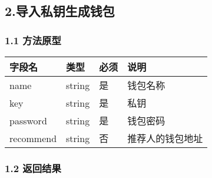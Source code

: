 \documentclass[letterpaper,10pt,english]{sphinxmanual}
\begin{document}

\begin{sphinxVerbatim}[commandchars=\\\{\}]
     
\end{sphinxVerbatim}


\subsection{2.导入私钥生成钱包}
\label{\detokenize{BCBWalletSDK_u63a5_u53e3_u8bf4_u660e:id21}}

\subsubsection{1.1 方法原型}
\label{\detokenize{BCBWalletSDK_u63a5_u53e3_u8bf4_u660e:id22}}



\begin{savenotes}\sphinxattablestart
\centering
\begin{tabulary}{\linewidth}[t]{|T|T|T|T|}
\hline
\sphinxstyletheadfamily 
字段名
&\sphinxstyletheadfamily 
类型
&\sphinxstyletheadfamily 
必须
&\sphinxstyletheadfamily 
说明
\\
\hline
name
&
string
&
是
&
钱包名称
\\
\hline
key
&
string
&
是
&
私钥
\\
\hline
password
&
string
&
是
&
钱包密码
\\
\hline
recommend
&
string
&
否
&
推荐人的钱包地址
\\
\hline
\end{tabulary}
\par
\sphinxattableend\end{savenotes}


\subsubsection{1.2 返回结果}
\label{\detokenize{BCBWalletSDK_u63a5_u53e3_u8bf4_u660e:id23}}
\end{document}
